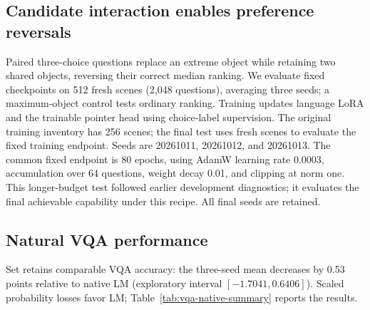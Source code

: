 \subsection{Candidate interaction enables preference reversals}
Paired three-choice questions replace an extreme object while retaining two shared objects, reversing their correct median ranking. We evaluate fixed checkpoints on 512 fresh scenes (2,048 questions), averaging three seeds; a maximum-object control tests ordinary ranking.
Training updates language LoRA and the trainable pointer head using choice-label supervision. The original training inventory has 256 scenes; the final test uses fresh scenes to evaluate the fixed training endpoint. Seeds are 20261011, 20261012, and 20261013. The common fixed endpoint is 80 epochs, using AdamW learning rate 0.0003, accumulation over 64 questions, weight decay 0.01, and clipping at norm one. This longer-budget test followed earlier development diagnostics; it evaluates the final achievable capability under this recipe. All final seeds are retained.



\subsection{Natural VQA performance}
Set retains comparable VQA accuracy: the three-seed mean decreases by 0.53 points relative to native LM (exploratory interval $[-1.7041,0.6406]$). Scaled probability losses favor LM; Table~\ref{tab:vqa-native-summary} reports the results.

